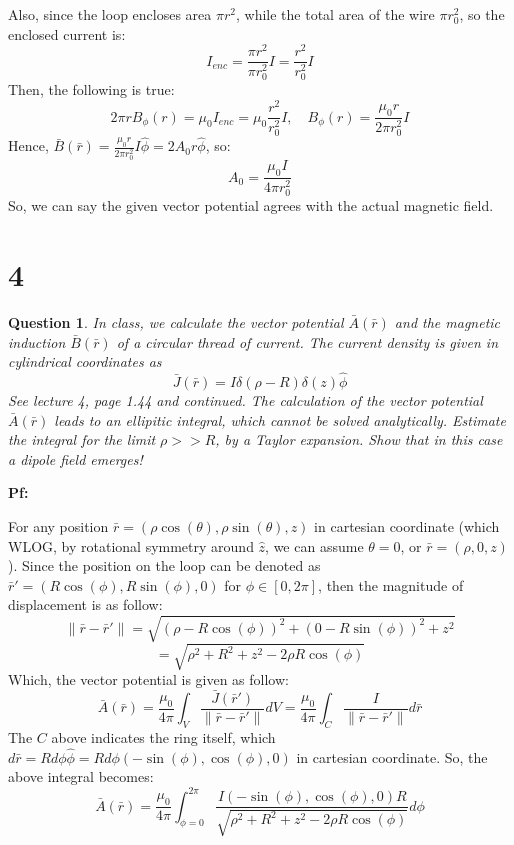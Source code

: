 \documentclass{article}
\newtheorem{question}{Question}
\begin{document}
Also, since the loop encloses area $\pi r^2$, while the total area of the wire $\pi r_{0}^2$, so the enclosed current is:
$$I_{enc}=\frac{\pi r^2}{\pi r_0^2}I = \frac{r^2}{r_0^2}I$$
Then, the following is true:
$$2\pi rB_\phi(r)=\mu_0 I_{enc}=\mu_0\frac{r^2}{r_0^2}I,\quad B_\phi(r)=\frac{\mu_0r}{2\pi r_0^2}I$$
Hence, $\bar{B}(\bar{r})=\frac{\mu_0r}{2\pi r_0^2}I\hat{\phi}=2A_0r\hat{\phi}$, so: 
$$A_0 = \frac{\mu_0I}{4\pi r_0^2}$$
So, we can say the given vector potential agrees with the actual magnetic field.

\break

\section*{4}
\begin{myBox}[]{}
    \begin{question}
        In class, we calculate the vector potential $\bar{A}(\bar{r})$ and the magnetic induction $\bar{B}(\bar{r})$ of a circular
        thread of current. The current density is given in cylindrical coordinates as
        $$\bar{J}(\bar{r})=I\delta(\rho-R)\delta(z)\hat{\phi}$$
        See lecture 4, page 1.44 and continued. The calculation of the vector potential $\bar{A}(\bar{r})$ leads to
        an ellipitic integral, which cannot be solved analytically. Estimate the integral for the limit
        $\rho>> R$, by a Taylor expansion. Show that in this case a dipole field emerges!
    \end{question}
\end{myBox}

\textbf{Pf:}

For any position $\bar{r}=(\rho \cos(\theta),\rho\sin(\theta),z)$ in cartesian coordinate (which WLOG, by rotational symmetry around $\hat{z}$, we can assume $\theta=0$, or $\bar{r}=(\rho,0,z)$). 
Since the position on the loop can be denoted as $\bar{r}'=(R\cos(\phi),R\sin(\phi),0)$ for $\phi\in[0,2\pi]$,
then the magnitude of displacement is as follow:
$$\|\bar{r}-\bar{r}'\|=\sqrt{(\rho-R\cos(\phi))^2+(0-R\sin(\phi))^2+z^2}$$
$$=\sqrt{\rho^2+R^2+z^2-2\rho R\cos(\phi)}$$
Which, the vector potential is given as follow:
$$\bar{A}(\bar{r})=\frac{\mu_0}{4\pi}\int_{V}\frac{\bar{J}(\bar{r}')}{\|\bar{r}-\bar{r}'\|}dV=\frac{\mu_0}{4\pi}\int_{C}\frac{I}{\|\bar{r}-\bar{r}'\|}d\bar{r}$$
The $C$ above indicates the ring itself, which $d\bar{r}=Rd\phi\hat{\phi}=Rd\phi(-\sin(\phi),\cos(\phi),0)$ in cartesian coordinate. So, the above integral becomes:
$$\bar{A}(\bar{r})=\frac{\mu_0}{4\pi}\int_{\phi=0}^{2\pi}\frac{I(-\sin(\phi),\cos(\phi),0)R}{\sqrt{\rho^2+R^2+z^2-2\rho R\cos(\phi)}}d\phi$$
\end{document}
